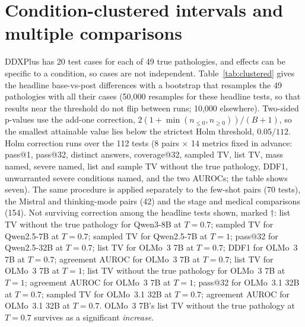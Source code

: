 \documentclass[wcp]{jmlr}
\begin{document}
\section{Condition-clustered intervals and multiple comparisons}\label{app:clustered}
DDXPlus has 20 test cases for each of 49 true pathologies, and effects can be specific to a condition, so cases are not independent. Table~\ref{tab:clustered} gives the headline base-vs-post differences with a bootstrap that resamples the 49 pathologies with all their cases (50,000 resamples for these headline tests, so that results near the threshold do not flip between runs; 10,000 elsewhere). Two-sided p-values use the add-one correction, $2(1+\min(n_{\le 0}, n_{\ge 0}))/(B+1)$, so the smallest attainable value lies below the strictest Holm threshold, $0.05/112$. Holm correction runs over the 112 tests (8 pairs $\times$ 14 metrics fixed in advance: pass@1, pass@32, distinct answers, coverage@32, sampled TV, list TV, mass named, severe named, list and sample TV without the true pathology, DDF1, unwarranted severe conditions named, and the two AUROCs; the table shows seven). The same procedure is applied separately to the few-shot pairs (70 tests), the Mistral and thinking-mode pairs (42) and the stage and medical comparisons (154). Not surviving correction among the headline tests shown, marked $\dagger$: list TV without the true pathology for Qwen3-8B at $T{=}0.7$; sampled TV for Qwen2.5-7B at $T{=}0.7$; sampled TV for Qwen2.5-7B at $T{=}1$; pass@32 for Qwen2.5-32B at $T{=}0.7$; list TV for OLMo~3 7B at $T{=}0.7$; DDF1 for OLMo~3 7B at $T{=}0.7$; agreement AUROC for OLMo~3 7B at $T{=}0.7$; list TV for OLMo~3 7B at $T{=}1$; list TV without the true pathology for OLMo~3 7B at $T{=}1$; agreement AUROC for OLMo~3 7B at $T{=}1$; pass@32 for OLMo~3.1 32B at $T{=}0.7$; sampled TV for OLMo~3.1 32B at $T{=}0.7$; agreement AUROC for OLMo~3.1 32B at $T{=}0.7$. OLMo~3 7B's list TV without the true pathology at $T{=}0.7$ survives as a significant \emph{increase}.
\end{document}
